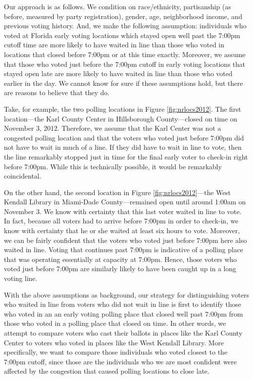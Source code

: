\documentclass[12pt,titlepage]{article}
\begin{document}

Our approach is as follows.  We condition on race/ethnicity,
partisanship (as before, measured by party registration), gender, age,
neighborhood income, and previous voting history.  And, we make the
following assumption: individuals who voted at Florida early voting
locations which stayed open well past the 7:00pm cutoff time are more
likely to have waited in line than those who voted in locations that
closed before 7:00pm or at this time exactly.  Moreover, we assume
that those who voted just before the 7:00pm cutoff in early voting
locations that stayed open late are more likely to have waited in line
than those who voted earlier in the day.  We cannot know for sure if
these assumptions hold, but there are reasons to believe that they do.

Take, for example, the two polling locations in Figure
\ref{fig:nrlocs2012}.  The first location---the Karl County Center in
Hillsborough County---closed on time on November 3, 2012.  Therefore,
we assume that the Karl Center was not a congested polling location
and that the voters who voted just before 7:00pm did not have to wait
in much of a line.  If they did have to wait in line to vote, then the
line remarkably stopped just in time for the final early voter to
check-in right before 7:00pm.  While this is technically possible, it
would be remarkably coincidental.

On the other hand, the second location in Figure
\ref{fig:nrlocs2012}---the West Kendall Library in Miami-Dade
County---remained open until around 1:00am on November 3.  We know
with certainty that this last voter waited in line to vote.  In fact,
because all voters had to arrive before 7:00pm in order to check-in,
we know with certainty that he or she waited at least six hours to
vote.  Moreover, we can be fairly confident that the voters who voted
just before 7:00pm here also waited in line.  Voting that continues
past 7:00pm is indicative of a polling place that was operating
essentially at capacity at 7:00pm.  Hence, those voters who voted just
before 7:00pm are similarly likely to have been caught up in a long
voting line.

With the above assumptions as background, our strategy for
distinguishing voters who waited in line from voters who did not wait
in line is first to identify those who voted in an an early voting
polling place that closed well past 7:00pm from those who voted in a
polling place that closed on time.  In other words, we attempt to
compare voters who cast their ballots in places like the Karl County
Center to voters who voted in places like the West Kendall Library.
More specifically, we want to compare those individuals who voted
closest to the 7:00pm cutoff, since those are the individuals who we
are most confident were affected by the congestion that caused polling
locations to close late.
 
\end{document}

